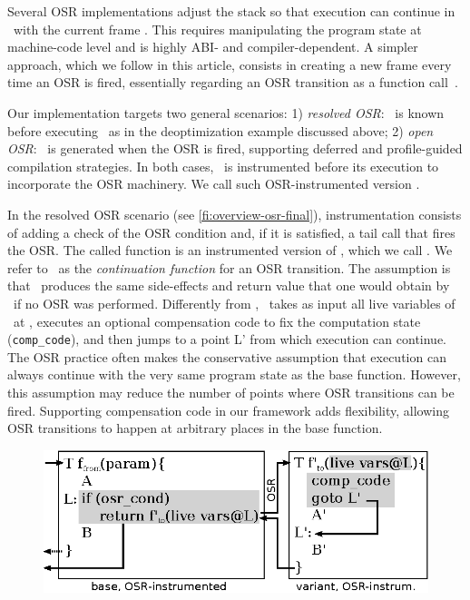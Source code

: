 Several OSR implementations adjust the stack so that execution can continue in \fvariant\ with the current frame \cite{chambers1991self,holzle1992self, suganuma2006region}. This requires manipulating the program state at machine-code level and is highly ABI- and compiler-dependent. A simpler approach, which we follow in this article, consists in creating a new frame every time an OSR is fired, essentially regarding an OSR transition as a function call~\cite{lameed2013modular,webkit14}. 

Our implementation targets two general scenarios: 1) {\em resolved OSR}: \fvariant\ is known before executing \fbase\ as in the deoptimization example discussed above; 2) {\em open OSR}: \fvariant\ is generated when the OSR is fired, supporting deferred and profile-guided compilation strategies. In both cases, \fbase\ is instrumented before its execution to incorporate the OSR machinery. We call such OSR-instrumented version \fosrfrom.

In the resolved OSR scenario (see \myfigure\ref{fi:overview-osr-final}), instrumentation consists of adding a check of the OSR condition and, if it is satisfied, a tail call that fires the OSR. The called function is an instrumented version of \fvariant, which we call \fosrto. We refer to \fosrto\ as the {\em continuation function} for an OSR transition. The assumption is that \fosrto\ produces the same side-effects and return value that one would obtain by \fbase\ if no OSR was performed. Differently from \fvariant, \fosrto\ takes as input all live variables of \fbase\ at \osrpoint, executes an optional compensation code to fix the computation state ({\tt comp\_code}), and then jumps to a point \textsf{L'} from which execution can continue. The OSR practice often makes the conservative assumption that execution can always continue with the very same program state as the base function. However, this assumption may reduce the number of
points where OSR transitions can be fired. Supporting compensation code in our framework adds flexibility, allowing OSR transitions to happen at arbitrary places in the base function.

\ifdefined\noauthorea
\begin{figure}[t]
\begin{center}
\includegraphics[width=0.7\columnwidth]{figures/overview-osr-final/overview-osr-final.eps}
\caption{\protect}
\end{center}
\end{figure}
\fi

